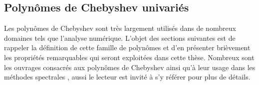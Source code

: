

\subsection{Polynômes de Chebyshev univariés}
Les polynômes de Chebyshev sont très largement utilisés dans de nombreux domaines tels que l'analyse numérique.
L'objet des sections suivantes est de rappeler la définition de cette famille de polynômes et d'en présenter brièvement les propriétés remarquables qui seront exploitées dans cette thèse. 
Nombreux sont les ouvrages consacrés aux polynômes de Chebyshev \cite{mason2002, gil2007} ainsi qu'à leur usage dans les méthodes spectrales \cite{boyd2001, canuto2006}, aussi le lecteur est invité à s'y référer pour plus de détails.

